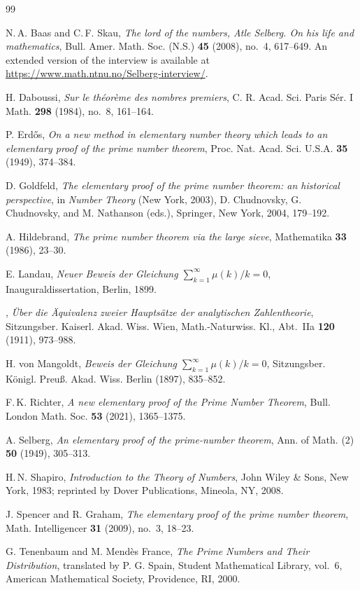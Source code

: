 \documentclass[11pt]{amsart}
\theoremstyle{remark}
\begin{document}
\begin{thebibliography}{99}

N.\,A. Baas and C.\,F. Skau, \emph{The lord of the numbers, Atle Selberg. On his life and mathematics}, Bull. Amer. Math. Soc. (N.S.) \textbf{45} (2008), no.~4, 617--649.
An extended version of the interview is available at \url{https://www.math.ntnu.no/Selberg-interview/}.

H. Daboussi, \emph{Sur le th\'eor\`eme des nombres premiers},
C. R. Acad. Sci. Paris S\'er. I Math. \textbf{298} (1984),
no.~8, 161--164.

P. Erd\H{o}s, \emph{On a new method in elementary number theory
which leads to an elementary proof of the prime number theorem},
Proc. Nat. Acad. Sci. U.S.A. \textbf{35} (1949), 374--384.

D. Goldfeld, \emph{The elementary proof of the prime number theorem:
an historical perspective}, in \emph{Number Theory} (New York, 2003),
D. Chudnovsky, G. Chudnovsky, and M. Nathanson (eds.),
Springer, New York, 2004, 179--192.

A. Hildebrand, \emph{The prime number theorem via the large sieve},
Mathematika \textbf{33} (1986), 23--30.

E. Landau, \emph{Neuer Beweis der Gleichung
$\sum_{k=1}^{\infty}\mu(k)/k=0$}, Inauguraldissertation,
Berlin, 1899.

\bysame, \emph{\"Uber die \"Aquivalenz zweier Haupts\"atze
der analytischen Zahlentheorie}, Sitzungsber. Kaiserl. Akad.
Wiss. Wien, Math.-Naturwiss. Kl., Abt.~IIa \textbf{120} (1911),
973--988.

H. von Mangoldt, \emph{Beweis der Gleichung
$\sum_{k=1}^{\infty}\mu(k)/k=0$}, Sitzungsber. K\"onigl.
Preu\ss. Akad. Wiss. Berlin (1897), 835--852.

F.\,K. Richter, \emph{A new elementary proof of the Prime Number
Theorem}, Bull. London Math. Soc. \textbf{53} (2021), 1365--1375.

A. Selberg, \emph{An elementary proof of the prime-number theorem},
Ann. of Math. (2) \textbf{50} (1949), 305--313.

H.\,N. Shapiro, \emph{Introduction to the Theory of Numbers},
John Wiley \& Sons, New York, 1983; reprinted by Dover
Publications, Mineola, NY, 2008.

J. Spencer and R. Graham, \emph{The elementary proof of the prime
number theorem}, Math. Intelligencer \textbf{31} (2009),
no.~3, 18--23.

G. Tenenbaum and M. Mend\`es France, \emph{The Prime Numbers and
Their Distribution}, translated by P. G. Spain, Student
Mathematical Library, vol.~6, American Mathematical Society,
Providence, RI, 2000.
\end{thebibliography}
\end{document}
